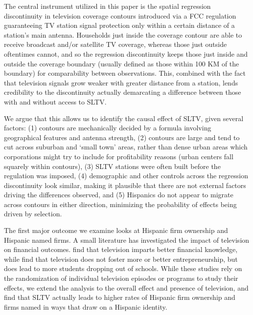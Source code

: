 \documentclass[11pt]{article}
\begin{document}


The central instrument utilized in this paper is the spatial regression discontinuity in television coverage contours introduced via a FCC regulation guaranteeing TV station signal protection only within a certain distance of a station's main antenna. Households just inside the coverage contour are able to receive broadcast and/or satellite TV coverage, whereas those just outside oftentimes cannot, and so the regression discontinuity keeps those just inside and outside the coverage boundary (usually defined as those within 100 KM of the boundary) for comparability between observations. This, combined with the fact that television signals grow weaker with greater distance from a station, lends credibility to the discontinuity actually demarcating a difference between those with and without access to SLTV.

We argue that this allows us to identify the causal effect of SLTV, given several factors: (1) contours are mechanically decided by a formula involving geographical features and antenna strength, (2) contours are large and tend to cut across suburban and `small town' areas, rather than dense urban areas which corporations might try to include for profitability reasons (urban centers fall squarely within contours), (3) SLTV stations were often built before the regulation was imposed, (4) demographic and other controls across the regression discontinuity look similar, making it plausible that there are not external factors driving the differences observed, and (5) Hispanics do not appear to migrate across contours in either direction, minimizing the probability of effects being driven by selection.

The first major outcome we examine looks at Hispanic firm ownership and Hispanic named firms. A small literature has investigated the impact of television on financial outcomes. \cite{bjorvatn_teaching_2019} find that television imparts better financial knowledge, while \cite{berg_harnessing_2017} find that television does not foster more or better entrepreneurship, but does lead to more students dropping out of schools. While these studies rely on the randomization of individual television episodes or programs to study their effects, we extend the analysis to the overall effect and presence of television, and find that SLTV actually leads to higher rates of Hispanic firm ownership and firms named in ways that draw on a Hispanic identity.
\end{document}
